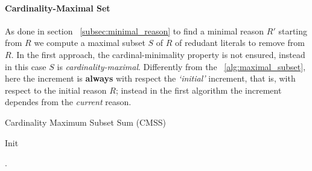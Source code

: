 \paragraph{Cardinality-Maximal Set}
As done in section ~\ref{subsec:minimal_reason} to find a minimal reason $R'$ starting 
from $R$ we compute a maximal subset $S$ of $R$ of redudant literals to remove from $R$.
In the first approach, the cardinal-minimality property is not ensured, instead 
in this case $S$ is \textit{cardinality-maximal}.
Differently from the ~\ref{alg:maximal_subset}, here the increment is \textbf{always}
with respect the \textit{`initial'} increment, that is, with respect to the initial reason $R$;
instead in the first algorithm the increment dependes from the \textit{current} reason.
  
\begin{algorithm}[H]\small
\caption{Cardinality Maximum Subset Sum (CMSS)}
    \label{alg:CMSS}
\end{algorithm}

\begin{algorithm}[H]\small
    \caption{Init}
        \label{alg:init}
        .
\end{algorithm}

